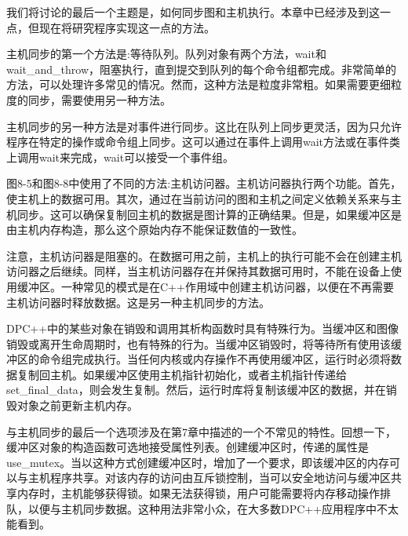 我们将讨论的最后一个主题是，如何同步图和主机执行。本章中已经涉及到这一点，但现在将研究程序实现这一点的方法。\par

主机同步的第一个方法是:等待队列。队列对象有两个方法，wait和wait\_and\_throw，阻塞执行，直到提交到队列的每个命令组都完成。非常简单的方法，可以处理许多常见的情况。然而，这种方法是粒度非常粗。如果需要更细粒度的同步，需要使用另一种方法。\par

主机同步的另一种方法是对事件进行同步。这比在队列上同步更灵活，因为只允许程序在特定的操作或命令组上同步。这可以通过在事件上调用wait方法或在事件类上调用wait来完成，wait可以接受一个事件组。\par

图8-5和图8-8中使用了不同的方法:主机访问器。主机访问器执行两个功能。首先，使主机上的数据可用。其次，通过在当前访问的图和主机之间定义依赖关系来与主机同步。这可以确保复制回主机的数据是图计算的正确结果。但是，如果缓冲区是由主机内存构造，那么这个原始内存不能保证数值的一致性。\par

注意，主机访问器是阻塞的。在数据可用之前，主机上的执行可能不会在创建主机访问器之后继续。同样，当主机访问器存在并保持其数据可用时，不能在设备上使用缓冲区。一种常见的模式是在C++作用域中创建主机访问器，以便在不再需要主机访问器时释放数据。这是另一种主机同步的方法。\par

DPC++中的某些对象在销毁和调用其析构函数时具有特殊行为。当缓冲区和图像销毁或离开生命周期时，也有特殊的行为。当缓冲区销毁时，将等待所有使用该缓冲区的命令组完成执行。当任何内核或内存操作不再使用缓冲区，运行时必须将数据复制回主机。如果缓冲区使用主机指针初始化，或者主机指针传递给set\_final\_data，则会发生复制。然后，运行时库将复制该缓冲区的数据，并在销毁对象之前更新主机内存。\par

与主机同步的最后一个选项涉及在第7章中描述的一个不常见的特性。回想一下，缓冲区对象的构造函数可选地接受属性列表。创建缓冲区时，传递的属性是use\_mutex。当以这种方式创建缓冲区时，增加了一个要求，即该缓冲区的内存可以与主机程序共享。对该内存的访问由互斥锁控制，当可以安全地访问与缓冲区共享内存时，主机能够获得锁。如果无法获得锁，用户可能需要将内存移动操作排队，以便与主机同步数据。这种用法非常小众，在大多数DPC++应用程序中不太能看到。\par


